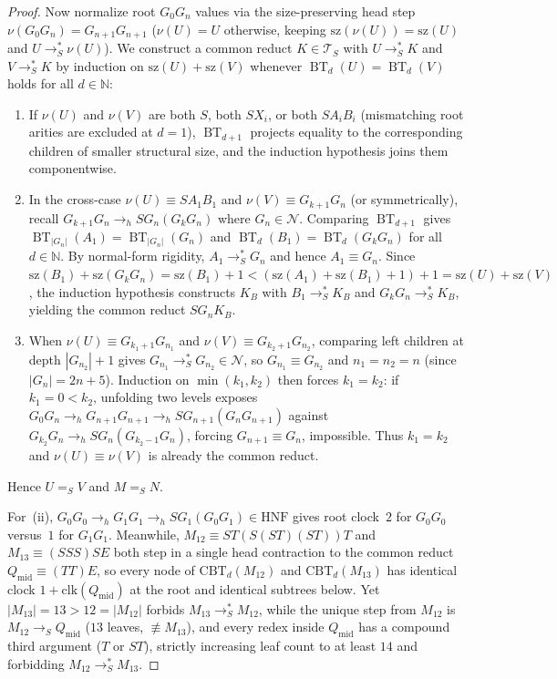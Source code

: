\documentclass[11pt,reqno]{amsart}
\numberwithin{equation}{section}
\theoremstyle{plain}
\theoremstyle{definition}
\theoremstyle{remark}
\DeclareMathOperator{\BT}{BT}
\newcommand{\TS}{\mathcal{T}_S}
\newcommand{\HNF}{\mathrm{HNF}}
\newcommand{\redS}{\to_S}
\newcommand{\redSs}{\to_S^*}
\newcommand{\convS}{=_S}
\begin{document}
\begin{proof}
Now normalize root $G_0 G_n$ values via the size-preserving head step $\nu(G_0 G_n) = G_{n+1} G_{n+1}$ ($\nu(U) = U$ otherwise, keeping $\mathrm{sz}(\nu(U)) = \mathrm{sz}(U)$ and $U \redSs \nu(U)$). We construct a common reduct $K \in \TS$ with $U \redSs K$ and $V \redSs K$ by induction on $\mathrm{sz}(U) + \mathrm{sz}(V)$ whenever $\BT_d(U) = \BT_d(V)$ holds for all $d \in \mathbb{N}$:
\begin{enumerate}[label=(\alph*),leftmargin=2.2em]
  \item If $\nu(U)$ and $\nu(V)$ are both $S$, both $S X_i$, or both $S A_i B_i$ (mismatching root arities are excluded at $d = 1$), $\BT_{d+1}$ projects equality to the corresponding children of smaller structural size, and the induction hypothesis joins them componentwise.
  \item In the cross-case $\nu(U) \equiv S A_1 B_1$ and $\nu(V) \equiv G_{k+1} G_n$ (or symmetrically), recall $G_{k+1} G_n \to_h S G_n (G_k G_n)$ where $G_n \in \mathcal{N}$. Comparing $\BT_{d+1}$ gives $\BT_{|G_n|}(A_1) = \BT_{|G_n|}(G_n)$ and $\BT_d(B_1) = \BT_d(G_k G_n)$ for all $d \in \mathbb{N}$. By normal-form rigidity, $A_1 \redSs G_n$ and hence $A_1 \equiv G_n$. Since $\mathrm{sz}(B_1) + \mathrm{sz}(G_k G_n) = \mathrm{sz}(B_1) + 1 < (\mathrm{sz}(A_1) + \mathrm{sz}(B_1) + 1) + 1 = \mathrm{sz}(U) + \mathrm{sz}(V)$, the induction hypothesis constructs $K_B$ with $B_1 \redSs K_B$ and $G_k G_n \redSs K_B$, yielding the common reduct $S G_n K_B$.
  \item When $\nu(U) \equiv G_{k_1+1} G_{n_1}$ and $\nu(V) \equiv G_{k_2+1} G_{n_2}$, comparing left children at depth $|G_{n_2}| + 1$ gives $G_{n_1} \redSs G_{n_2} \in \mathcal{N}$, so $G_{n_1} \equiv G_{n_2}$ and $n_1 = n_2 = n$ (since $|G_n| = 2n + 5$). Induction on $\min(k_1, k_2)$ then forces $k_1 = k_2$: if $k_1 = 0 < k_2$, unfolding two levels exposes $G_0 G_n \to_h G_{n+1} G_{n+1} \to_h S G_{n+1} (G_n G_{n+1})$ against $G_{k_2} G_n \to_h S G_n (G_{k_2-1} G_n)$, forcing $G_{n+1} \equiv G_n$, impossible. Thus $k_1 = k_2$ and $\nu(U) \equiv \nu(V)$ is already the common reduct.
\end{enumerate}
Hence $U \convS V$ and $M \convS N$.

For~(ii), $G_0 G_0 \to_h G_1 G_1 \to_h S G_1 (G_0 G_1) \in \HNF$ gives root clock~$2$ for $G_0 G_0$ versus~$1$ for $G_1 G_1$. Meanwhile, $M_{12} \equiv S T (S(S T)(S T)) T$ and $M_{13} \equiv (S S S) S E$ both step in a single head contraction to the common reduct $Q_{\mathrm{mid}} \equiv (T T) E$, so every node of $\mathrm{CBT}_d(M_{12})$ and $\mathrm{CBT}_d(M_{13})$ has identical clock $1 + \mathrm{clk}(Q_{\mathrm{mid}})$ at the root and identical subtrees below. Yet $|M_{13}| = 13 > 12 = |M_{12}|$ forbids $M_{13} \redSs M_{12}$, while the unique step from $M_{12}$ is $M_{12} \redS Q_{\mathrm{mid}}$ ($13$ leaves, $\not\equiv M_{13}$), and every redex inside $Q_{\mathrm{mid}}$ has a compound third argument ($T$ or $S T$), strictly increasing leaf count to at least $14$ and forbidding $M_{12} \redSs M_{13}$.
\end{proof}
\end{document}
